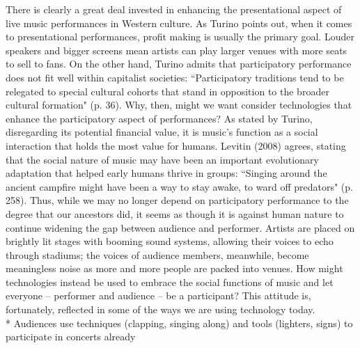 There is clearly a great deal invested in enhancing the presentational aspect of live music performances in Western culture. As Turino points out, when it comes to presentational performances, profit making is usually the primary goal. Louder speakers and bigger screens mean artists can play larger venues with more seats to sell to fans. On the other hand, Turino admits that participatory performance does not fit well within capitalist societies: ``Participatory traditions tend to be relegated to special cultural cohorts that stand in opposition to the broader cultural formation" (p. 36). Why, then, might we want consider technologies that enhance the participatory aspect of performances? As stated by Turino, disregarding its potential financial value, it is music's function as a social interaction that holds the most value for humans. Levitin (2008) agrees, stating that the social nature of music may have been an important evolutionary adaptation that helped early humans thrive in groups: ``Singing around the ancient campfire might have been a way to stay awake, to ward off predators" (p. 258). Thus, while we may no longer depend on participatory performance to the degree that our ancestors did, it seems as though it is against human nature to continue widening the gap between audience and performer. Artists are placed on brightly lit stages with booming sound systems, allowing their voices to echo through stadiums; the voices of audience members, meanwhile, become meaningless noise as more and more people are packed into venues. How might technologies instead be used to embrace the social functions of music and let everyone -- performer and audience -- be a participant? This attitude is, fortunately, reflected in some of the ways we are using technology today.\\

* Audiences use techniques (clapping, singing along) and tools (lighters, signs) to participate in concerts already

